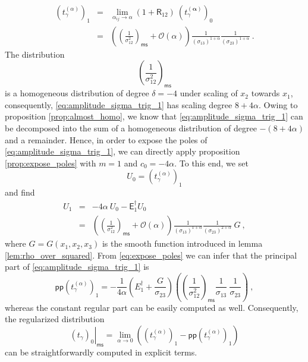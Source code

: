 \documentclass[12pt]{book}
\newcommand{\pp}{\mathsf{pp}}
\newcommand{\ms}{\mathsf{ms}}
\newcommand{\Ocal}{\mathcal{O}}
\newcommand{\Esf}{\mathsf{E}}
\newcommand{\Rsf}{\mathsf{R}}
\theoremstyle{break}
\begin{document}
%
\begin{eqnarray}
\left(t_{\gamma}^{(\alpha)}\right)_1 &=& \lim_{\alpha_{ij}\to\alpha} (1+\Rsf_{12}) \ \left(t_{\gamma}^{(\boldsymbol{\alpha})}\right)_0 \nonumber \\
&=& \left(\left(\frac{1}{\sigma_{12}^2}\right)_\ms + \Ocal(\alpha)\right) \frac{1}{(\sigma_{13})^{1+\alpha}} \frac{1}{(\sigma_{23})^{1+\alpha}} \ .
\label{eq:amplitude_sigma_trig_1}
\end{eqnarray}
%
The distribution 
%
\begin{equation*}
\left(\frac{1}{\sigma^2_{12}}\right)_\ms 
\end{equation*}
%
is a homogeneous distribution of degree $\delta=-4$ under scaling of $x_2$ towards $x_1$, consequently, \eqref{eq:amplitude_sigma_trig_1} has scaling degree $8+4\alpha$. Owing to proposition \ref{prop:almost_homo}, we know that \eqref{eq:amplitude_sigma_trig_1} can be decomposed into the sum of a homogeneous distribution of degree $-(8+4\alpha)$ and a remainder. Hence, in order to expose the poles of \eqref{eq:amplitude_sigma_trig_1}, we can directly apply proposition \ref{prop:expose_poles} with $m=1$ and $c_0 = -4\alpha$. To this end, we set 
%
\begin{equation*}
U_0 = \left(t_{\gamma}^{(\alpha)}\right)_1
\end{equation*}
%
and find 
%
\begin{eqnarray*}
U_1 &=& -4 \alpha \ U_0 - \Esf^\dagger_1 U_0 \\
&=& \left(\left(\frac{1}{\sigma_{12}^{2}} \right)_\ms + \Ocal(\alpha) \right) \frac{1}{(\sigma_{13})^{1+\alpha}} \frac{1}{(\sigma_{23})^{2+\alpha}} \ G \ ,
\end{eqnarray*}
%
where $G=G(x_1,x_2,x_3)$ is the smooth function introduced in lemma \ref{lem:rho_over_squared}. From \eqref{eq:expose_poles} we can infer that the principal part of \eqref{eq:amplitude_sigma_trig_1} is
%
\begin{equation*}
\pp\left(t_{\gamma}^{(\alpha)}\right)_1 = - \frac{1}{4\alpha} \left(E^\dagger_1 + \frac{G}{\sigma_{23}}\right) \left( \left(\frac{1}{\sigma_{12}^2}\right)_\ms \frac{1}{\sigma_{13}} \ \frac{1}{\sigma_{23}} \right) \ ,
\end{equation*}
%
whereas the constant regular part can be easily computed as well. Consequently, the regularized distribution
%
\begin{equation*}
\left.(t_{\gamma})_0\right|_\ms = \lim_{\alpha\to 0} \left( \left(t_{\gamma}^{(\alpha)}\right)_1 - \pp \left(t_{\gamma}^{(\alpha)}\right)_1 \right)
\end{equation*}
%
can be straightforwardly computed in explicit terms.
\end{document}
